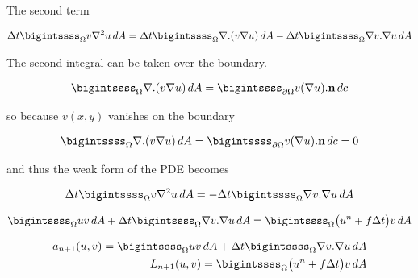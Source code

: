 \documentclass{article}
\begin{document}
	The second term
	
	\begin{gather}
	\begin{split}
	\Delta t \bigintssss_{\Omega} v\nabla^2u \,dA = \Delta t \bigintssss_{\Omega} \nabla.(v\nabla u) \,dA - \Delta t \bigintssss_{\Omega} \nabla v.\nabla u \,dA 
	\end{split}
	\end{gather}
	
	The second integral can be taken over the boundary.
	
	\begin{gather}
	\begin{split}
	 \bigintssss_{\Omega} \nabla.(v\nabla u) \,dA = \bigintssss_{\partial\Omega} v(\nabla u).\textbf{n} \,dc
	\end{split}
	\end{gather}
	
	so because $v(x,y)$ vanishes on the boundary
	
	\begin{gather}
	\begin{split}
	\bigintssss_{\Omega} \nabla.(v\nabla u) \,dA = \bigintssss_{\partial\Omega} v(\nabla u).\textbf{n} \,dc = 0
	\end{split}
	\end{gather}
	
	and thus the weak form of the PDE becomes
	
	\begin{gather}
	\begin{split}
	\Delta t \bigintssss_{\Omega} v\nabla^2u \,dA = - \Delta t \bigintssss_{\Omega} \nabla v.\nabla u \,dA 
	\end{split}
	\end{gather}
	
	
	\begin{gather}
	\begin{split}
	\bigintssss_{\Omega} uv\,dA + \Delta t \bigintssss_{\Omega} \nabla v.\nabla u \,dA  =  \bigintssss_{\Omega} \big(u^n + f \Delta t\big)v\,dA
	\end{split}
	\end{gather}
	
	\begin{gather}
	\begin{split}
	a_{n+1}(u,v) = \bigintssss_{\Omega} uv\,dA + \Delta t \bigintssss_{\Omega} \nabla v.\nabla u \,dA \\
	L_{n+1}(u,v) = \bigintssss_{\Omega} \big(u^n + f \Delta t\big)v\,dA
	\end{split}
	\end{gather}
	
\end{document}
